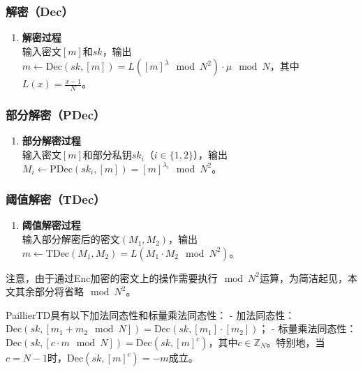 \subsubsection{解密（Dec）}
\begin{enumerate}[leftmargin=*, nosep]
    \item \textbf{解密过程}  \\
    输入密文\([m]\)和\(sk\)，输出\( m \leftarrow \text{Dec}(sk, [m]) = L([m]^\lambda \mod N^2) \cdot \mu \mod N \)，其中\( L(x) = \frac{x-1}{N} \)。
\end{enumerate}

\subsubsection{部分解密（PDec）}
\begin{enumerate}[leftmargin=*, nosep]
    \item \textbf{部分解密过程}  \\
    输入密文\([m]\)和部分私钥\( sk_i \)（\( i \in \{1, 2\} \)），输出\( M_i \leftarrow \text{PDec}(sk_i, [m]) = [m]^{\lambda_i} \mod N^2 \)。
\end{enumerate}

\subsubsection{阈值解密（TDec）}
\begin{enumerate}[leftmargin=*, nosep]
    \item \textbf{阈值解密过程}  \\
    输入部分解密后的密文\( (M_1, M_2) \)，输出\( m \leftarrow \text{TDec}(M_1, M_2) = L(M_1 \cdot M_2 \mod N^2) \)。
\end{enumerate}

注意，由于通过Enc加密的密文上的操作需要执行\( \mod N^2 \)运算，为简洁起见，本文其余部分将省略\( \mod N^2 \)。

PaillierTD具有以下加法同态性和标量乘法同态性：
- 加法同态性：\(\text{Dec}(sk, [m_1 + m_2 \mod N]) = \text{Dec}(sk, [m_1] \cdot [m_2])\)；
- 标量乘法同态性：\(\text{Dec}(sk, [c \cdot m \mod N]) = \text{Dec}(sk, [m]^c)\)，其中\( c \in \mathbb{Z}_N \)。特别地，当\( c = N - 1 \)时，\(\text{Dec}(sk, [m]^c) = -m\)成立。

